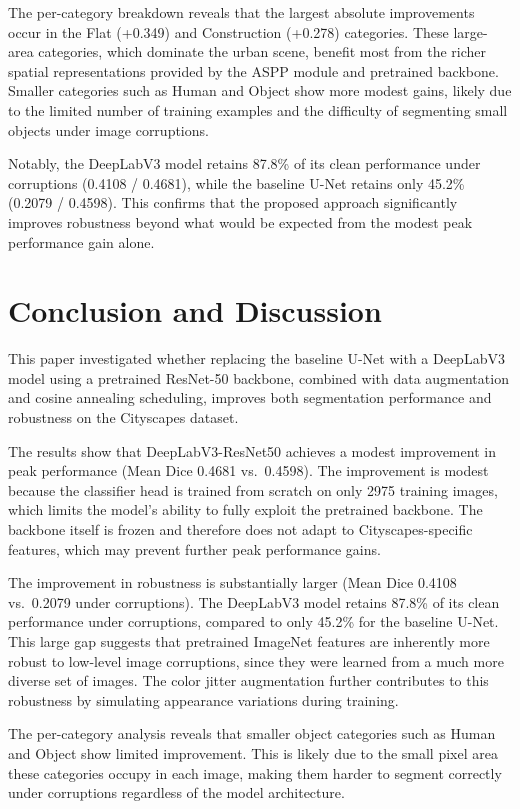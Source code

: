 \documentclass[conference]{IEEEtran}
\begin{document}
The per-category breakdown reveals that the largest absolute improvements occur in the Flat (+0.349) and Construction (+0.278) categories. These large-area categories, which dominate the urban scene, benefit most from the richer spatial representations provided by the ASPP module and pretrained backbone. Smaller categories such as Human and Object show more modest gains, likely due to the limited number of training examples and the difficulty of segmenting small objects under image corruptions.

Notably, the DeepLabV3 model retains 87.8\% of its clean performance under corruptions (0.4108 / 0.4681), while the baseline U-Net retains only 45.2\% (0.2079 / 0.4598). This confirms that the proposed approach significantly improves robustness beyond what would be expected from the modest peak performance gain alone.


\section{Conclusion and Discussion}

This paper investigated whether replacing the baseline U-Net with a DeepLabV3 model using a pretrained ResNet-50 backbone, combined with data augmentation and cosine annealing scheduling, improves both segmentation performance and robustness on the Cityscapes dataset.

The results show that DeepLabV3-ResNet50 achieves a modest improvement in peak performance (Mean Dice 0.4681 vs.\ 0.4598). The improvement is modest because the classifier head is trained from scratch on only 2975 training images, which limits the model's ability to fully exploit the pretrained backbone. The backbone itself is frozen and therefore does not adapt to Cityscapes-specific features, which may prevent further peak performance gains.

The improvement in robustness is substantially larger (Mean Dice 0.4108 vs.\ 0.2079 under corruptions). The DeepLabV3 model retains 87.8\% of its clean performance under corruptions, compared to only 45.2\% for the baseline U-Net. This large gap suggests that pretrained ImageNet features are inherently more robust to low-level image corruptions, since they were learned from a much more diverse set of images. The color jitter augmentation further contributes to this robustness by simulating appearance variations during training.

The per-category analysis reveals that smaller object categories such as Human and Object show limited improvement. This is likely due to the small pixel area these categories occupy in each image, making them harder to segment correctly under corruptions regardless of the model architecture.
\end{document}
